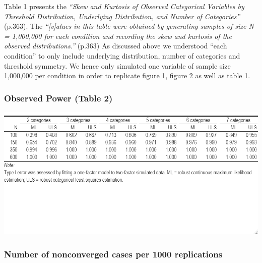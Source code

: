 \documentclass[10,a4paperpaper,]{article}
\begin{document}
Table 1 presents the \emph{``Skew and Kurtosis of Observed Categorical
Variables by Threshold Distribution, Underlying Distribution, and Number
of Categories''} (p.363). The \emph{``{[}v{]}alues in this table were
obtained by generating samples of size N = 1,000,000 for each condition
and recording the skew and kurtosis of the observed distributions.''}
(p.363) As discussed above we understood ``each condition'' to only
include underlying distribution, number of categories and threshold
symmetry. We hence only simulated one variable of sample size 1,000,000
per condition in order to replicate figure 1, figure 2 as well as table
1.

\subsubsection{Observed Power (Table 2)}

\includegraphics[width=450pt]{./figures/table2}

\subsubsection{Number of nonconverged cases per 1000 replications}
\end{document}

